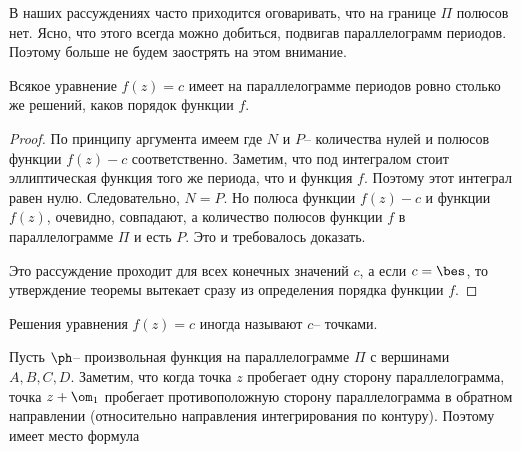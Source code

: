 \documentclass[a4paper]{article}
\begin{document}
\begin{note}
В наших рассуждениях часто приходится оговаривать, что на границе $\Pi$ полюсов нет.
Ясно, что этого всегда можно добиться, подвигав параллелограмм периодов.
Поэтому больше не будем заострять на этом внимание.
\end{note}

\begin{theorem}
Всякое уравнение $f(z) = c$ имеет на параллелограмме периодов ровно столько же решений,
каков порядок функции $f$.
\end{theorem}
\begin{proof}
По принципу аргумента имеем
где $N$ и $P$-- количества нулей и полюсов функции $f(z) - c$ соответственно.
Заметим, что под интегралом стоит эллиптическая функция того же периода, что и функция $f$. Поэтому
этот интеграл равен нулю. Следовательно, $N = P$. Но полюса функции
$f(z) - c$ и функции $f(z)$, очевидно, совпадают, а количество полюсов функции $f$ в параллелограмме
$\Pi$ и есть $P$. Это и требовалось доказать.

Это рассуждение проходит для всех конечных значений $c$, а если $c = \bes$, то утверждение
теоремы вытекает сразу из определения порядка функции $f$.
\end{proof}

\begin{df}
Решения уравнения $f(z) = c$ иногда называют $c$-- точками.
\end{df}

\begin{note}
Пусть $\ph$-- произвольная функция на параллелограмме $\Pi$ с вершинами $A,B,C,D$. Заметим,
что когда точка $z$ пробегает одну сторону параллелограмма, точка $z +\om_1$ пробегает
противоположную сторону параллелограмма в обратном направлении (относительно направления
интегрирования по контуру). Поэтому имеет место формула
\end{note}
\end{document}
